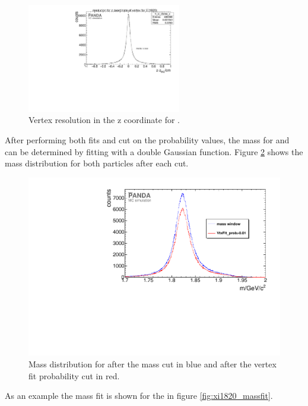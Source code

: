 	\begin{figure}
		\centering
		\includegraphics[width=0.6\textwidth]{./plots/Xi1820/XiMinus1820_vtxres_z.pdf}
		\caption{\propose Vertex resolution in the z coordinate for \excitedcascade.}
		\label{fig:Xi1820_vtxz}
	\end{figure}
	
	After performing both fits and cut on the probability values, the mass for \excitedcascade and \excitedanticascade
	can be determined by fitting with a double Gaussian function. 
	Figure \ref{fig:xi1820_mass_diffcuts} shows the mass distribution for both particles after each cut.
	
	\begin{figure}
		\centering
		\includegraphics[width=1.\textwidth]{./plots/Xi1820/XiMinus1820_m_diffcuts.pdf}
		\caption{\propose Mass distribution for \excitedcascade after the mass cut in blue and after the vertex fit probability cut in red.}
		\label{fig:xi1820_mass_diffcuts}
	
	\end{figure}
	As an example the mass fit is shown for the \excitedcascade in figure \ref{fig:xi1820_massfit}. 
	
